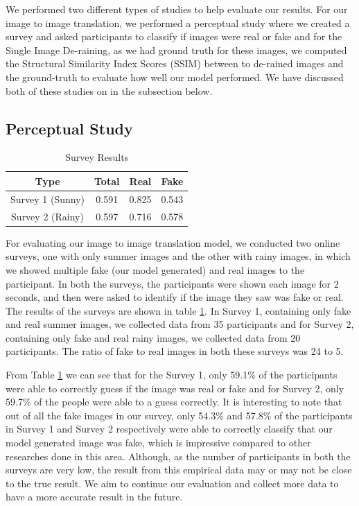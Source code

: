 \documentclass{article}
\begin{document}
We performed two different types of studies to help evaluate our results. For our image to image translation, we performed a perceptual study where we created a survey and asked participants to classify if images were real or fake and for the Single Image De-raining, as we had ground truth for these images, we computed the Structural Similarity Index Scores (SSIM) between to de-rained images and the ground-truth to evaluate how well our model performed. We have discussed both of these studies on in the subsection below.

\subsection{Perceptual Study}

\begin{table} [h!]
\centering
\begin{tabular}{ | c | c | c | c |}
\hline
 Type & Total & Real & Fake \\ 
\hline
 Survey 1 (Sunny) &  0.591 & 0.825 & 0.543 \\  
 Survey 2 (Rainy) & 0.597 & 0.716 & 0.578 \\
 \hline
\end{tabular}
\caption{Survey Results}
\label{table:1}
\end{table}

For evaluating our image to image translation model, we conducted two online surveys, one with only summer images and the other with rainy images, in which we showed multiple fake (our model generated) and real images to the participant. In both the surveys, the participants were shown each image for 2 seconds, and then were asked to identify if the image they saw was fake or real. The results of the surveys are shown in table \ref{table:1}. In Survey 1, containing only fake and real summer images, we collected data from 35 participants and for Survey 2, containing only fake and real rainy images, we collected data from 20 participants. The ratio of fake to real images in both these surveys was 24 to 5. 

From Table \ref{table:1} we can see that for the Survey 1, only 59.1\% of the participants were able to correctly guess if the image was real or fake and for Survey 2, only 59.7\% of the people were able to a guess correctly. It is interesting to note that out of all the fake images in our survey, only 54.3\% and 57.8\% of the participants in Survey 1 and  Survey 2 respectively were able to correctly classify that our model generated image was fake, which is impressive compared to other researches done in this area. Although, as the number of participants in both the surveys are very low, the result from this empirical data may or may not be close to the true result. We aim to continue our evaluation and collect more data to have a more accurate result in the future.
\end{document}
